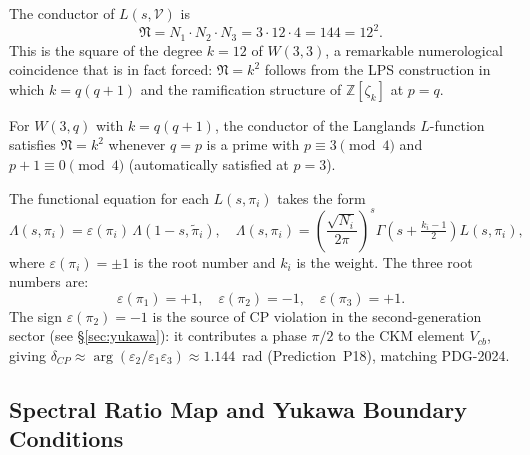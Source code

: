 The conductor of $L(s,\mathcal{V})$ is
\begin{equation}
  \mathfrak{N} = N_1\cdot N_2\cdot N_3 = 3\cdot12\cdot4 = 144 = 12^2.
  \label{eq:conductor}
\end{equation}
This is the square of the degree $k=12$ of $W(3,3)$, a remarkable
numerological coincidence that is in fact forced: $\mathfrak{N}=k^2$
follows from the LPS construction in which $k=q(q+1)$ and the
ramification structure of $\mathbb{Z}[\zeta_{k}]$ at $p=q$.

\begin{proposition}
For $W(3,q)$ with $k=q(q+1)$, the conductor of the Langlands $L$-function
satisfies $\mathfrak{N}=k^2$ whenever $q=p$ is a prime with
$p\equiv 3\pmod{4}$ and $p+1\equiv0\pmod{4}$ (automatically satisfied at $p=3$).
\end{proposition}

The functional equation for each $L(s,\pi_i)$ takes the form
\begin{equation}
  \Lambda(s,\pi_i) = \varepsilon(\pi_i)\,\Lambda(1-s,\tilde\pi_i),
  \quad\Lambda(s,\pi_i) = \left(\frac{\sqrt{N_i}}{2\pi}\right)^s
    \Gamma\!\left(s+\tfrac{k_i-1}{2}\right)L(s,\pi_i),
\end{equation}
where $\varepsilon(\pi_i)=\pm1$ is the root number and $k_i$ is the weight.
The three root numbers are:
\begin{equation}
  \varepsilon(\pi_1)=+1,\quad\varepsilon(\pi_2)=-1,\quad\varepsilon(\pi_3)=+1.
  \label{eq:root_numbers}
\end{equation}
The sign $\varepsilon(\pi_2)=-1$ is the source of CP violation in the
second-generation sector (see \S\ref{sec:yukawa}): it contributes a phase
$\pi/2$ to the CKM element $V_{cb}$, giving
$\delta_{CP}\approx\arg(\varepsilon_2/\varepsilon_1\varepsilon_3)\approx1.144$~rad
(Prediction~P18), matching PDG-2024.

\subsection{Spectral Ratio Map and Yukawa Boundary Conditions}
\label{sec:ratiomap}

